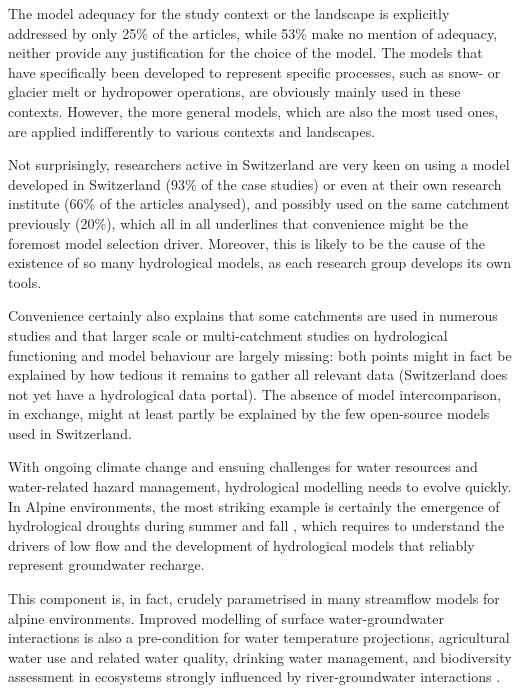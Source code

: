 \documentclass[10pt,a4paper]{article}
\begin{document}
The model adequacy for the study context or the landscape is explicitly addressed by only 25\% of the articles, while 53\% make no mention of adequacy, neither provide any justification for the choice of the model. The models that have specifically been developed to represent specific processes, such as snow- or glacier melt or hydropower operations, are obviously mainly used in these contexts. However, the more general models, which are also the most used ones, are applied indifferently to various contexts and landscapes.

Not surprisingly, researchers active in Switzerland are very keen on using a model developed in Switzerland (93\% of the case studies) or even at their own research institute (66\% of the articles analysed), and possibly used on the same catchment previously (20\%), which all in all underlines that convenience might be the foremost model selection driver. Moreover, this is likely to be the cause of the existence of so many hydrological models, as each research group develops its own tools.

Convenience certainly also explains that some catchments are used in numerous studies and that larger scale or multi-catchment studies on hydrological functioning and model behaviour are largely missing: both points might in fact be explained by how tedious it remains to gather all relevant data (Switzerland does not yet have a hydrological data portal). The absence of model intercomparison, in exchange, might at least partly be explained by the few open-source models used in
Switzerland. 

With ongoing climate change and ensuing challenges for water resources and water-related hazard management, hydrological modelling needs to evolve quickly. In Alpine environments, the most striking example is certainly the emergence of hydrological droughts \citep{VanLoon2015} during summer and fall \citep{Brunner2019e, Rigling2020}, which requires to understand the drivers of low flow \citep{Arnoux2020} and the development of hydrological models that reliably represent groundwater recharge.

This component is, in fact, crudely parametrised in many streamflow models for alpine environments. Improved modelling of surface water-groundwater interactions is also a pre-condition for water temperature projections, agricultural water use and related water quality, drinking water management, and biodiversity assessment in ecosystems strongly influenced by river-groundwater interactions \citep{Brunner2017}. 
\end{document}
